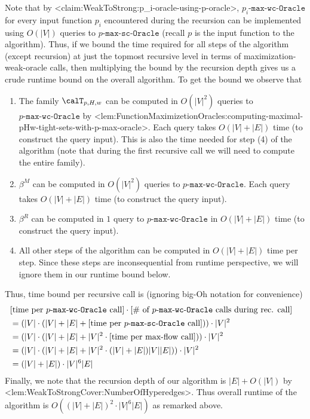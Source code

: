 \documentclass{article}
\def\Cref#1{<#1>}%
\newcommand{\functionMaximizationOracle}[1]{\ensuremath{{#1}\text{-}\mathtt{max}\text{-}\mathtt{wc}\text{-}\mathtt{Oracle}}\xspace}
\newcommand{\functionMaximizationOracleStrongCover}[1]{\ensuremath{{#1}\text{-}\mathtt{max}\text{-}\mathtt{sc}\text{-}\mathtt{Oracle}}\xspace}
\newcommand{\maximalTightSetFamily}[1]{\ensuremath{\calT_{#1}}\xspace}
\begin{document}
{    Note that by \Cref{claim:WeakToStrong:p_i-oracle-using-p-oracle}, \functionMaximizationOracle{p_i} for every input function $p_i$ encountered during the recursion can be implemented using $O(|V|)$ queries to $\functionMaximizationOracleStrongCover{p}$ (recall $p$ is the input function to the algorithm). Thus,  if we bound the time required for all steps of the algorithm (except recursion) at just the topmost recursive level in terms of maximization-weak-oracle calls, then multiplying the bound by the recursion depth gives us a crude runtime bound on the overall algorithm. To get the bound we observe that
    \begin{enumerate}
    \item The family $\maximalTightSetFamily{p, H, w}$ can be computed in $O(|V|^2)$ queries to $\functionMaximizationOracle{p}$ by \Cref{lem:FunctionMaximizetionOracles:computing-maximal-pHw-tight-sets-with-p-max-oracle}. Each query takes $O(|V| + |E|)$ time (to construct the query input).
     This is also the time needed for step (4) of the algorithm (note that during the first recursive call we will need to compute the entire family).
    \item $\beta^M$ can be computed in $O(|V|^2)$ queries to $\functionMaximizationOracle{p}$. Each query takes $O(|V| + |E|)$ time (to construct the query input).
    \item $\beta^R$ can be computed in $1$ query to $\functionMaximizationOracle{p}$ in $O(|V| + |E|)$ time (to construct the query input).
    \item All other steps of the algorithm can be computed in $O(|V| + |E|)$ time per step. Since these steps are inconsequential from runtime perspective, we will ignore them in our runtime bound below.
\end{enumerate}
Thus, time bound per recursive call is (ignoring big-Oh notation for convenience)
\begin{align*}
    &[\text{time per  \functionMaximizationOracle{p} call}] \cdot [\text{$\#$ of  \functionMaximizationOracle{p} calls during rec. call}] &\\
    & = (|V| \cdot (|V| + |E| + [\text{time per  \functionMaximizationOracleStrongCover{p} call}])) \cdot |V|^2&\\
    &= (|V| \cdot (|V| + |E| + |V|^2\cdot[\text{time per max-flow call}])) \cdot |V|^2&\\
    &= (|V| \cdot (|V| + |E| + |V|^2\cdot(|V|+|E|)|V||E|)) \cdot |V|^2&\\
    & = (|V| + |E|)\cdot|V|^{6}|E|&
\end{align*}
Finally, we note that the recursion depth of our algorithm is $|E| + O(|V|)$ by \Cref{lem:WeakToStrongCover:NumberOfHyperedges}. Thus overall runtime of the algorithm is $O((|V| + |E|)^2\cdot|V|^{6}|E|)$ as remarked above.
}
\fi
\end{document}
